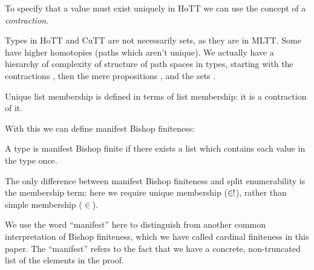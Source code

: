 To specify that a value must exist uniquely in HoTT we can use the concept of a
\emph{contraction}.

\begin{definition} \label{homotopy-types}
  Types in HoTT and CuTT are not necessarily sets, as they are in MLTT.
  Some have higher homotopies (paths which aren't unique).
  We actually have a hierarchy of complexity of structure of path spaces in
  types, starting with the contractions \cite[definition 3.11.1]{hottbook}, then
  the mere propositions \cite[definition 3.3.1]{hottbook}, and the sets
  \cite[definition 3.1.1]{hottbook}.
  \begin{agdalisting}
  \end{agdalisting}
\end{definition}
\begin{definition} \label{uniq-memb-def}
  Unique list membership is defined in terms of list membership: it is a
  contraction of it.
  \begin{agdalisting}
  \end{agdalisting}
\end{definition}

With this we can define manifest Bishop finiteness:
\begin{definition}  \label{bish-def}
  A type is manifest Bishop finite if there exists a list which contains each
  value in the type once.
  \begin{agdalisting}
  \end{agdalisting}
\end{definition}
The only difference between manifest Bishop finiteness and split enumerability
is the membership term: here we require unique membership (\(\inunique\)),
rather than simple membership (\(\in\)).

We use the word ``manifest'' here to distinguish from another common
interpretation of Bishop finiteness, which we have called cardinal finiteness in
this paper.
The ``manifest'' refers to the fact that we have a concrete, non-truncated list
of the elements in the proof.

